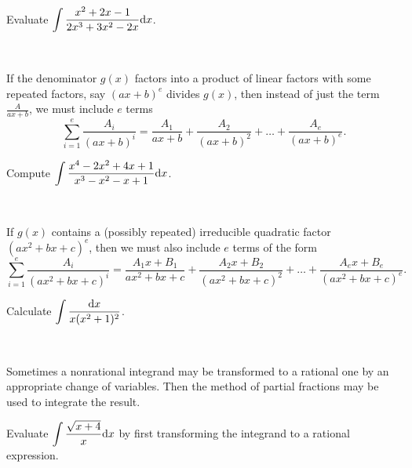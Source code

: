 \begin{example}
Evaluate $\displaystyle\int\frac{x^2+2x-1}{2x^3+3x^2-2x}\mathrm{d} x$.
\end{example}

\newpage
\,
\newpage

\begin{remark}
If the denominator $g(x)$ factors into a product of linear factors with some repeated factors, say $(ax+b)^e$ divides $g(x)$, 
then instead of just the term $\frac{A}{ax+b}$, we must include $e$ terms
\begin{equation*}
\sum_{i=1}^e\frac{A_{i}}{(ax+b)^i} = \frac{A_{1}}{ax+b} + \frac{A_{2}}{(ax+b)^2}+\dots +\frac{A_{e}}{(ax+b)^e}.
\end{equation*}
\end{remark}

\begin{example}
Compute $\displaystyle\int\frac{x^4-2x^2+4x+1}{x^3-x^2-x+1}\mathrm{d} x$.
\end{example}

\newpage
\,
\newpage

\begin{remark}
If $g(x)$ contains a (possibly repeated) irreducible quadratic factor $(ax^2+bx+c)^e$, then we must also include $e$ terms of the form
\begin{equation*}
\sum_{i=1}^e\frac{A_{i}}{(ax^2+bx+c)^i} = \frac{A_{1}x+B_1}{ax^2+bx+c} + \frac{A_{2}x+B_2}{(ax^2+bx+c)^2}+\dots +\frac{A_{e}x+B_e}{(ax^2+bx+c)^e}.
\end{equation*}
\end{remark}

\begin{example}
Calculate $\displaystyle\int\frac{\mathrm{d} x}{x(x^2+1)^2}$.
\end{example}

\newpage
\,
\newpage

\begin{remark}
Sometimes a nonrational integrand may be transformed to a rational one by an appropriate change of variables.
Then the method of partial fractions may be used to integrate the result.
\end{remark}

\begin{example}
Evaluate $\displaystyle\int\frac{\sqrt{x+4}}{x}\mathrm{d} x$ by first transforming the integrand to a rational expression.
\end{example}
